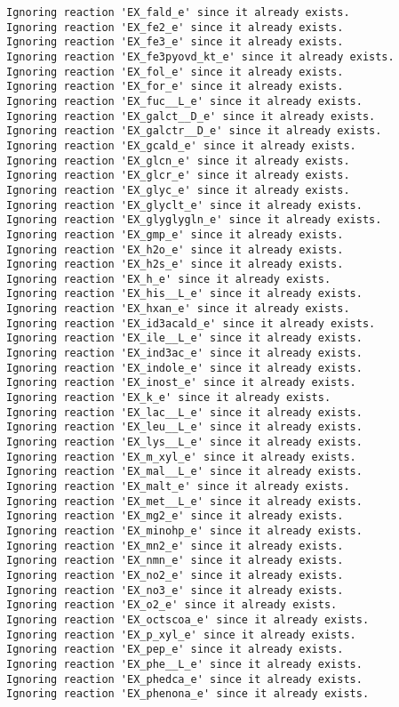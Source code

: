 \documentclass[
  letterpaper,
  DIV=11,
  numbers=noendperiod]{scrartcl}
\begin{document}
\begin{verbatim}
Ignoring reaction 'EX_fald_e' since it already exists.
Ignoring reaction 'EX_fe2_e' since it already exists.
Ignoring reaction 'EX_fe3_e' since it already exists.
Ignoring reaction 'EX_fe3pyovd_kt_e' since it already exists.
Ignoring reaction 'EX_fol_e' since it already exists.
Ignoring reaction 'EX_for_e' since it already exists.
Ignoring reaction 'EX_fuc__L_e' since it already exists.
Ignoring reaction 'EX_galct__D_e' since it already exists.
Ignoring reaction 'EX_galctr__D_e' since it already exists.
Ignoring reaction 'EX_gcald_e' since it already exists.
Ignoring reaction 'EX_glcn_e' since it already exists.
Ignoring reaction 'EX_glcr_e' since it already exists.
Ignoring reaction 'EX_glyc_e' since it already exists.
Ignoring reaction 'EX_glyclt_e' since it already exists.
Ignoring reaction 'EX_glyglygln_e' since it already exists.
Ignoring reaction 'EX_gmp_e' since it already exists.
Ignoring reaction 'EX_h2o_e' since it already exists.
Ignoring reaction 'EX_h2s_e' since it already exists.
Ignoring reaction 'EX_h_e' since it already exists.
Ignoring reaction 'EX_his__L_e' since it already exists.
Ignoring reaction 'EX_hxan_e' since it already exists.
Ignoring reaction 'EX_id3acald_e' since it already exists.
Ignoring reaction 'EX_ile__L_e' since it already exists.
Ignoring reaction 'EX_ind3ac_e' since it already exists.
Ignoring reaction 'EX_indole_e' since it already exists.
Ignoring reaction 'EX_inost_e' since it already exists.
Ignoring reaction 'EX_k_e' since it already exists.
Ignoring reaction 'EX_lac__L_e' since it already exists.
Ignoring reaction 'EX_leu__L_e' since it already exists.
Ignoring reaction 'EX_lys__L_e' since it already exists.
Ignoring reaction 'EX_m_xyl_e' since it already exists.
Ignoring reaction 'EX_mal__L_e' since it already exists.
Ignoring reaction 'EX_malt_e' since it already exists.
Ignoring reaction 'EX_met__L_e' since it already exists.
Ignoring reaction 'EX_mg2_e' since it already exists.
Ignoring reaction 'EX_minohp_e' since it already exists.
Ignoring reaction 'EX_mn2_e' since it already exists.
Ignoring reaction 'EX_nmn_e' since it already exists.
Ignoring reaction 'EX_no2_e' since it already exists.
Ignoring reaction 'EX_no3_e' since it already exists.
Ignoring reaction 'EX_o2_e' since it already exists.
Ignoring reaction 'EX_octscoa_e' since it already exists.
Ignoring reaction 'EX_p_xyl_e' since it already exists.
Ignoring reaction 'EX_pep_e' since it already exists.
Ignoring reaction 'EX_phe__L_e' since it already exists.
Ignoring reaction 'EX_phedca_e' since it already exists.
Ignoring reaction 'EX_phenona_e' since it already exists.

\end{verbatim}
\end{document}
